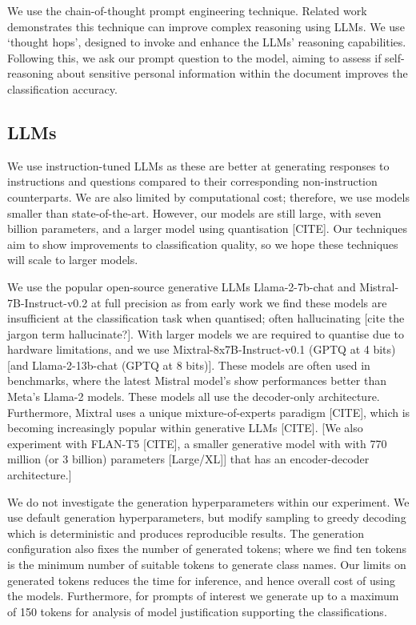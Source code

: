 We use the chain-of-thought prompt engineering technique. Related work demonstrates this technique can improve complex reasoning using LLMs. We use ‘thought hops’, designed to invoke and enhance the LLMs’ reasoning capabilities. Following this, we ask our prompt question to the model, aiming to assess if self-reasoning about sensitive personal information within the document improves the classification accuracy.

\subsection{LLMs}
\label{sec:experiment:LLMs}
We use instruction-tuned LLMs as these are better at generating responses to instructions and questions compared to their corresponding non-instruction counterparts. We are also limited by computational cost; therefore, we use models smaller than state-of-the-art. However, our models are still large, with seven billion parameters, and a larger model using quantisation \cite{}[CITE]. Our techniques aim to show improvements to classification quality, so we hope these techniques will scale to larger models.

We use the popular open-source generative LLMs Llama-2-7b-chat and Mistral-7B-Instruct-v0.2 at full precision as from early work we find these models are insufficient at the classification task when quantised; often hallucinating [cite the jargon term hallucinate?]. With larger models we are required to quantise due to hardware limitations, and we use Mixtral-8x7B-Instruct-v0.1 (GPTQ at 4 bits) [and Llama-2-13b-chat (GPTQ at 8 bits)]. These models are often used in benchmarks, where the latest Mistral model’s show performances better than Meta’s Llama-2 models. These models all use the decoder-only architecture. Furthermore, Mixtral uses a unique mixture-of-experts paradigm \cite{}[CITE], which is becoming increasingly popular within generative LLMs \cite{}[CITE]. [We also experiment with FLAN-T5 \cite{}[CITE], a smaller generative model with with 770 million (or 3 billion) parameters [Large/XL]] that has an encoder-decoder architecture.]

We do not investigate the generation hyperparameters within our experiment. We use default generation hyperparameters, but modify sampling to greedy decoding which is deterministic and produces reproducible results. The generation configuration also fixes the number of generated tokens; where we find ten tokens is the minimum number of suitable tokens to generate class names. Our limits on generated tokens reduces the time for inference, and hence overall cost of using the models. Furthermore, for prompts of interest we generate up to a maximum of 150 tokens for analysis of model justification supporting the classifications.

